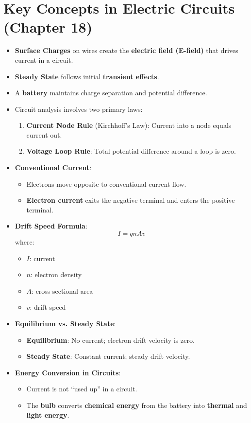 \documentclass{article}
\begin{document}
\section*{Key Concepts in Electric Circuits (Chapter 18)}
\begin{itemize}
    \item \textbf{Surface Charges} on wires create the \textbf{electric field (E-field)} that drives current in a circuit.
    \item \textbf{Steady State} follows initial \textbf{transient effects}.
    \item A \textbf{battery} maintains charge separation and potential difference.
    \item Circuit analysis involves two primary laws:
    \begin{enumerate}
        \item \textbf{Current Node Rule} (Kirchhoff’s Law): Current into a node equals current out.
        \item \textbf{Voltage Loop Rule}: Total potential difference around a loop is zero.
    \end{enumerate}
    \item \textbf{Conventional Current}:
    \begin{itemize}
        \item Electrons move opposite to conventional current flow.
        \item \textbf{Electron current} exits the negative terminal and enters the positive terminal.
    \end{itemize}
    \item \textbf{Drift Speed Formula}:
    \[
    I = q n A v
    \]
    where:
    \begin{itemize}
        \item \( I \): current
        \item \( n \): electron density
        \item \( A \): cross-sectional area
        \item \( v \): drift speed
    \end{itemize}
    \item \textbf{Equilibrium vs. Steady State}:
    \begin{itemize}
        \item \textbf{Equilibrium}: No current; electron drift velocity is zero.
        \item \textbf{Steady State}: Constant current; steady drift velocity.
    \end{itemize}
    \item \textbf{Energy Conversion in Circuits}:
    \begin{itemize}
        \item Current is not ``used up'' in a circuit.
        \item The \textbf{bulb} converts \textbf{chemical energy} from the battery into \textbf{thermal} and \textbf{light energy}.
    \end{itemize}
\end{itemize}
\end{document}
